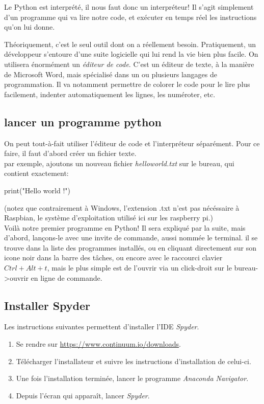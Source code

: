 Le Python est interprété, il nous faut donc un interpréteur! Il s'agit simplement d'un programme qui va lire notre code, et exécuter en temps réel les instructions qu'on lui donne.

Théoriquement, c'est le seul outil dont on a réellement besoin. Pratiquement, un développeur s'entoure d'une suite logicielle qui lui rend la vie bien plus facile. On utilisera énormément un \textit{éditeur de code}. C'est un éditeur de texte, à la manière de Microsoft Word, mais spécialisé dans un ou plusieurs langages de programmation. Il va notamment permettre de colorer le code pour le lire plus facilement, indenter automatiquement les lignes, les numéroter, etc.

\subsection{lancer un programme python}

On peut tout-à-fait utiliser l'éditeur de code et l'interpréteur séparément. Pour ce faire, il faut d'abord créer un fichier texte.\\
par exemple, ajoutons un nouveau fichier \textit{helloworld.txt} sur le bureau, qui contient exactement:
\begin{python}
print("Hello world !")
\end{python}
(notez que contrairement à Windows, l'extension .txt n'est pas nécéssaire à Raspbian, le système d'exploitation utilisé ici sur les raspberry pi.)
\\
Voilà notre premier programme en Python! Il sera expliqué par la suite, mais d'abord, lançons-le avec une invite de commande, aussi nommée le terminal. il se trouve dans la liste des programmes installés, ou en cliquant directement sur son icone noir dans la barre des tâches, ou encore avec le raccourci clavier $Ctrl + Alt + t$, mais le plus simple est de l'ouvrir via un click-droit sur le bureau->ouvrir en ligne de commande.

\subsection{Installer Spyder}

Les instructions suivantes permettent d'installer l'IDE \textit{Spyder}.

\begin{enumerate}
    \item Se rendre sur \url{https://www.continuum.io/downloads}.
    \item Télécharger l'installateur et suivre les instructions d'installation de celui-ci.
    \item Une fois l'installation terminée, lancer le programme \textit{Anaconda Navigator}.
    \item Depuis l'écran qui apparaît, lancer \textit{Spyder}.
\end{enumerate}

